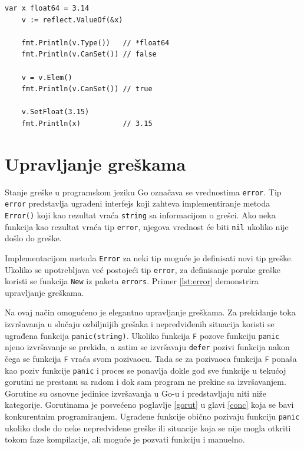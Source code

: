 \documentclass[12pt,oneside]{memoir}
\begin{document}
 \begin{center}
\begin{lstlisting}[caption=Osnovna upotreba refleksije, label={lst:ref},  backgroundcolor=\color{background}]
	var x float64 = 3.14
	v := reflect.ValueOf(&x) 
	
	fmt.Println(v.Type())	// *float64
	fmt.Println(v.CanSet())	// false
	
	v = v.Elem()
	fmt.Println(v.CanSet())	// true
	
	v.SetFloat(3.15)
	fmt.Println(x)			// 3.15
\end{lstlisting}
\end{center}

\section{Upravljanje greškama} \label{error}

Stanje greške u programskom jeziku Go označava se vrednostima \texttt{error}. Tip \texttt{error} predstavlja ugrađeni interfejs koji zahteva implementiranje metoda \texttt{Error()} koji kao rezultat vraća \texttt{string} sa informacijom o grešci. Ako neka funkcija kao rezultat vraća tip \texttt{error}, njegova vrednost će biti \texttt{nil} ukoliko nije došlo do greške. 

Implementacijom metoda \texttt{Error} za neki tip moguće je definisati novi tip greške. Ukoliko se upotrebljava već postojeći tip \texttt{error}, za definisanje poruke greške koristi se funkcija \texttt{New} iz paketa \texttt{errors}. Primer \ref{lst:error} demonstrira upravljanje greškama.

Na ovaj način omogućeno je elegantno upravljanje greškama. Za prekidanje toka izvršavanja u slučaju ozbiljnijih grešaka i nepredviđenih situacija koristi se ugrađena funkcija \texttt{panic(string)}. Ukoliko funkcija \texttt{F} pozove funkciju \texttt{panic} njeno izvršavanje se prekida, a zatim se izvršavaju \texttt{defer} pozivi funkcija nakon čega se funkcija \texttt{F} vraća svom pozivaocu. Tada se za pozivaoca funkcija \texttt{F} ponaša kao poziv funkcije \texttt{panic} i proces se ponavlja dokle god sve funkcije u tekućoj gorutini ne prestanu sa radom i dok sam program ne prekine sa izvršavanjem. Gorutine su osnovne jedinice izvršavanja u Go-u i predstavljaju niti niže kategorije. Gorutinama je posvećeno poglavlje \ref{gorut} u  glavi \ref{conc} koja se bavi konkurentnim programiranjem.  Ugrađene funkcije obično pozivaju funkciju \texttt{panic} ukoliko dođe do neke nepredviđene greške ili situacije koja se nije mogla otkriti tokom faze kompilacije, ali moguće je pozvati funkciju i manuelno. 
\end{document}
